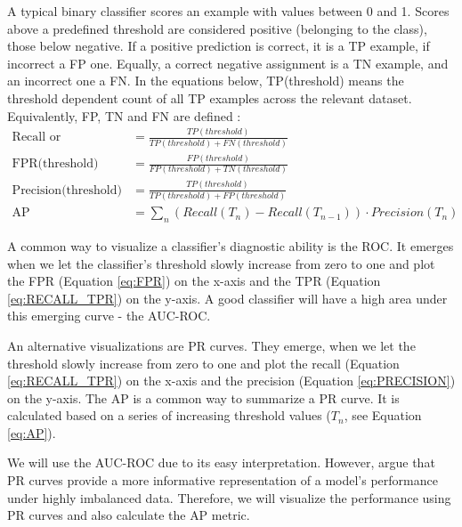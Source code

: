 \documentclass[msc,deptreport,ai]{infthesis} %
\begin{document}
		A typical binary classifier scores an example with values between 0 and 1. Scores above a predefined threshold are considered positive (belonging to the class), those below negative. If a positive prediction is correct, it is a \gls{TP} example, if incorrect a \gls{FP} one. Equally, a correct negative assignment is a \gls{TN} example, and an incorrect one a \gls{FN}. In the equations below, TP(threshold) means the threshold dependent count of all \gls{TP} examples across the relevant dataset. Equivalently, \gls{FP}, \gls{TN} and \gls{FN} are defined \cite{he_learning_2009}:
		\begin{align}
		    \textrm{Recall or TPR(threshold)} &= \frac{TP(threshold)}{TP(threshold) + FN(threshold)} \label{eq:RECALL_TPR} \\
		    \textrm{FPR(threshold)} &= \frac{FP(threshold)}{FP(threshold) + TN(threshold)} \label{eq:FPR} \\
		    \textrm{Precision(threshold)} &= \frac{TP(threshold)}{TP(threshold) + FP(threshold)} \label{eq:PRECISION} \\
		    \textrm{AP} &= \sum_n (Recall(T_n) - Recall(T_{n-1})) \cdot Precision(T_n) \label{eq:AP} 
		\end{align}
		
		A common way to visualize a classifier's diagnostic ability is the \gls{ROC}. It emerges when we let the classifier's threshold slowly increase from zero to one and plot the \gls{FPR} (Equation \ref{eq:FPR}) on the x-axis and the \gls{TPR} (Equation \ref{eq:RECALL_TPR}) on the y-axis. A good classifier will have a high area under this emerging curve - the \gls{AUC}-\gls{ROC}.
		
		An alternative visualizations are \gls{PR} curves. They emerge, when we let the threshold slowly increase from zero to one and plot the recall (Equation \ref{eq:RECALL_TPR}) on the x-axis and the precision (Equation \ref{eq:PRECISION}) on the y-axis. The \gls{AP} \cite{sklearn_sklearnmetricsaverage_precision_score_2021} is a common way to summarize a \gls{PR} curve. It is calculated based on a series of increasing threshold values ($T_n$, see Equation \ref{eq:AP}). 
		
		We will use the \gls{AUC}-\gls{ROC} due to its easy interpretation. However, \cite{he_learning_2009} argue that \gls{PR} curves provide a more informative representation of a model's performance under highly imbalanced data. Therefore, we will visualize the performance using \gls{PR} curves and also calculate the \gls{AP} metric.
\end{document}
